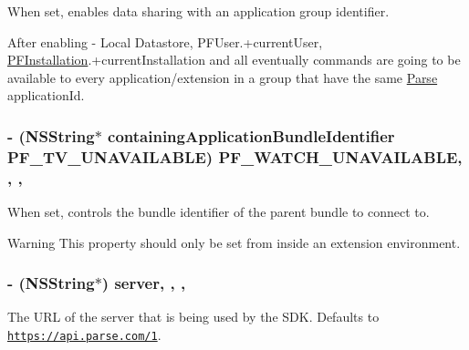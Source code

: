  





When set, enables data sharing with an application group identifier.

After enabling -\/ Local Datastore, {\ttfamily P\+F\+User.+current\+User}, {\ttfamily \hyperlink{interface_p_f_installation}{P\+F\+Installation}.+current\+Installation} and all eventually commands are going to be available to every application/extension in a group that have the same \hyperlink{interface_parse}{Parse} application\+Id. \hypertarget{protocol_parse_mutable_client_configuration-p_a0b25558cbdcf4b583196b1eca6d35b63}{}
\subsubsection[{P\+F\+\_\+\+W\+A\+T\+C\+H\+\_\+\+U\+N\+A\+V\+A\+I\+L\+A\+B\+L\+E}]{\setlength{\rightskip}{0pt plus 5cm}-\/ (N\+S\+String$\ast$ containing\+Application\+Bundle\+Identifier {\bf P\+F\+\_\+\+T\+V\+\_\+\+U\+N\+A\+V\+A\+I\+L\+A\+B\+L\+E}) P\+F\+\_\+\+W\+A\+T\+C\+H\+\_\+\+U\+N\+A\+V\+A\+I\+L\+A\+B\+L\+E\hspace{0.3cm}{\ttfamily [read]}, {\ttfamily [write]}, {\ttfamily [nonatomic]}, {\ttfamily [copy]}}\label{protocol_parse_mutable_client_configuration-p_a0b25558cbdcf4b583196b1eca6d35b63}
When set, controls the bundle identifier of the parent bundle to connect to.

\begin{DoxyWarning}{Warning}
This property should only be set from inside an extension environment. 
\end{DoxyWarning}
\hypertarget{protocol_parse_mutable_client_configuration-p_a42bf5a15b0cc4cf6203c9e7950a6ffdb}{}
\subsubsection[{server}]{\setlength{\rightskip}{0pt plus 5cm}-\/ (N\+S\+String$\ast$) server\hspace{0.3cm}{\ttfamily [read]}, {\ttfamily [write]}, {\ttfamily [nonatomic]}, {\ttfamily [copy]}}\label{protocol_parse_mutable_client_configuration-p_a42bf5a15b0cc4cf6203c9e7950a6ffdb}
The U\+R\+L of the server that is being used by the S\+D\+K. Defaults to {\ttfamily \href{https://api.parse.com/1}{\tt https\+://api.\+parse.\+com/1}}.

